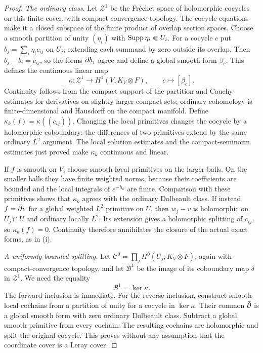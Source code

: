 \begin{proof}
\emph{The ordinary class.}
Let $\mathcal Z^1$ be the Fr\'echet space of holomorphic cocycles on
this finite cover, with compact-convergence topology.  The cocycle
equations make it a closed subspace of the finite product of overlap
section spaces.  Choose a smooth partition of unity $(\eta_i)$ with
$\operatorname{Supp}\eta_i\Subset U_i$.  For a cocycle $c$ put
$b_j=\sum_i\eta_i c_{ij}$ on $U_j$, extending each summand by zero
outside its overlap.  Then $b_j-b_i=c_{ij}$, so the forms $\bar\partial b_j$
agree and define a global smooth form $\beta_c$.  This defines the
continuous linear map
\[
 \kappa:\mathcal Z^1\longrightarrow H^1(V,K_V\otimes F),
 \qquad c\longmapsto[\beta_c].
\]
Continuity follows from the compact support of the partition and
Cauchy estimates for derivatives on slightly larger compact sets;
ordinary cohomology is finite-dimensional and Hausdorff on the compact
manifold.  Define $\kappa_k(f)=\kappa((c_{ij}))$.
Changing the local primitives
changes the cocycle by a holomorphic coboundary: the differences of
two primitives extend by the same ordinary $L^2$ argument.  The local
solution estimates and the compact-seminorm estimates just proved
make $\kappa_k$ continuous and linear.

If $f$ is smooth on $V$, choose smooth local primitives on the larger
balls.  On the smaller balls they have finite weighted norms, because
their coefficients are bounded and the local integrals of $e^{-h_k}$
are finite.  Comparison with these primitives shows that $\kappa_k$
agrees with the ordinary Dolbeault class.  If instead $f=\bar\partial v$ for
a global weighted $L^2$ primitive on $U$, then $w_j-v$ is holomorphic
on $U_j\cap U$ and ordinary locally $L^2$.  Its extension gives a
holomorphic splitting of $c_{ij}$, so $\kappa_k(f)=0$.  Continuity
therefore annihilates the closure of the actual exact forms, as in
(i).

\emph{A uniformly bounded splitting.}
Let
$\mathcal C^0=\prod_jH^0(U_j,K_V\otimes F)$, again with
compact-convergence topology, and let $\mathcal B^1$ be the image of
its coboundary map $\delta$ in $\mathcal Z^1$.  We need the equality
\begin{equation}\label{eq:closed-coboundary-kernel}
 \mathcal B^1=\ker\kappa.
\end{equation}
The forward inclusion is immediate.  For the reverse inclusion,
construct smooth local cochains from a partition of unity for a
cocycle in $\ker\kappa$.  Their common $\bar\partial$ is a global smooth
form with zero ordinary Dolbeault class.  Subtract a global smooth
primitive from every cochain.  The resulting cochains are
holomorphic and split the original cocycle.  This proves
 without any assumption that the
coordinate cover is a Leray cover.


\end{proof}
